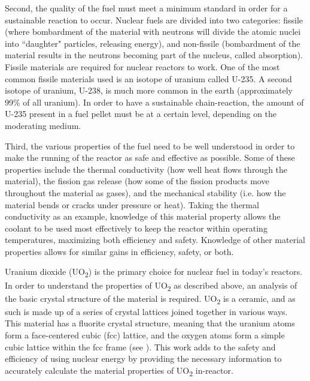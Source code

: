 \documentclass[12pt]{report}
\begin{document}
Second, the quality of the fuel must meet a minimum standard in order for a sustainable reaction to occur.  Nuclear fuels are divided into two categories: fissile (where bombardment of the material with neutrons will divide the atomic nuclei into ``daughter" particles, releasing energy), and non-fissile (bombardment of the material results in the neutrons becoming part of the nucleus, called absorption).  Fissile materials are required for nuclear reactors to work.  One of the most common fissile materials used is an isotope of uranium called U-235.  A second isotope of uranium, U-238, is much more common in the earth (approximately 99\% of all uranium).  In order to have a sustainable chain-reaction, the amount of U-235 present in a fuel pellet must be at a certain level, depending on the moderating medium.\cite{uraniumInfo}

Third, the various properties of the fuel need to be well understood in order to make the running of the reactor as safe and effective as possible.  Some of these properties include the thermal conductivity (how well heat flows through the material), the fission gas release (how some of the fission products move throughout the material as gases), and the mechanical stability (i.e. how the material bends or cracks under pressure or heat).  Taking the thermal conductivity as an example, knowledge of this material property allows the coolant to be used most effectively to keep the reactor within operating temperatures, maximizing both efficiency and safety.  Knowledge of other material properties allows for similar gains in efficiency, safety, or both.

Uranium dioxide (UO\textsubscript{2}) is the primary choice for nuclear fuel in today's reactors.\cite{uraniumInfo}  In order to understand the properties of UO\textsubscript{2} as described above, an analysis of the basic crystal structure of the material is required.  UO\textsubscript{2} is a ceramic, and as such is made up of a series of crystal lattices joined together in various ways.  This material has a fluorite crystal structure, meaning that the uranium atoms form a face-centered cubic (fcc) lattice, and the oxygen atoms form a simple cubic lattice within the fcc frame (see ).  This work adds to the safety and efficiency of using nuclear energy by providing the necessary information to accurately calculate the material properties of UO\textsubscript{2} in-reactor.
\end{document}
